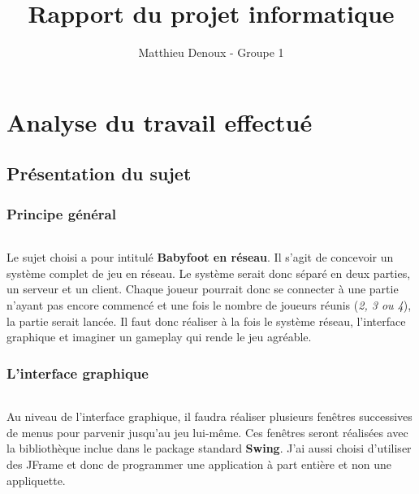 \documentclass[a4paper,12pt]{report}
\title{Rapport du projet informatique}
\author{Matthieu Denoux - Groupe 1}
\begin{document}
\maketitle
\tableofcontents
\newpage

\part{Analyse du travail effectué}
\chapter{Présentation du sujet}

\section{Principe général}
\paragraph{}
Le sujet choisi a pour intitulé \textbf{Babyfoot en réseau}. Il s'agit de concevoir un système complet de jeu en réseau.
Le système serait donc séparé en deux parties, un serveur et un client. Chaque joueur pourrait donc se connecter à une partie
n'ayant pas encore commencé et une fois le nombre de joueurs réunis (\emph{2, 3 ou 4}), la partie serait lancée. Il faut donc réaliser à la fois 
le système réseau, l'interface graphique et imaginer un gameplay qui rende le jeu agréable.

\section{L'interface graphique}
\paragraph{}
Au niveau de l'interface graphique, il faudra réaliser plusieurs fenêtres successives de menus pour parvenir jusqu'au jeu lui-même. Ces fenêtres seront réalisées avec la bibliothèque inclue dans le package standard \textbf{Swing}. J'ai aussi choisi d'utiliser des JFrame et donc de programmer une application à part entière et non une appliquette.
\end{document}
